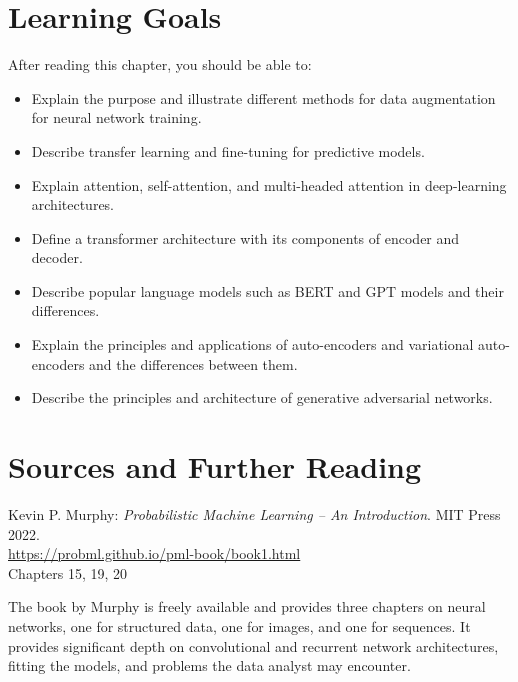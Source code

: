 %
%
\section*{Learning Goals}

After reading this chapter, you should be able to:
\begin{itemize}
   \item Explain the purpose and illustrate different methods for data augmentation for neural network training.
   \item Describe transfer learning and fine-tuning for predictive models.
   \item Explain attention, self-attention, and multi-headed attention in deep-learning architectures.
   \item Define a transformer architecture with its components of encoder and decoder.
   \item Describe popular language models such as BERT and GPT models and their differences.
   \item Explain the principles and applications of auto-encoders and variational auto-encoders and the differences between them.
   \item Describe the principles and architecture of generative adversarial networks.
\end{itemize}

\section*{Sources and Further Reading}

\begin{resourcebox}
Kevin P. Murphy: \emph{Probabilistic Machine Learning -- An Introduction}. MIT Press 2022. \\

\small\url{https://probml.github.io/pml-book/book1.html}\normalsize \\

Chapters 15, 19, 20
\end{resourcebox}

The book by Murphy is freely available and provides three chapters on neural networks, one for structured data, one for images, and one for sequences. It provides significant depth on convolutional and recurrent network architectures, fitting the models, and problems the data analyst may encounter. 

